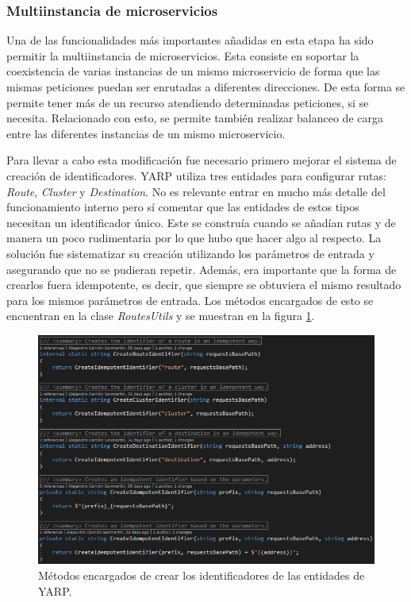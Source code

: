 \documentclass[11pt,spanish,listoffigures]{tfgetsinf}
\begin{document}

			\subsubsection{Multiinstancia de microservicios}

Una de las funcionalidades más importantes añadidas en esta etapa ha sido permitir la multiinstancia de microservicios. Esta consiste en soportar la coexistencia de varias instancias de un mismo microservicio de forma que las mismas peticiones puedan ser enrutadas a diferentes direcciones. De esta forma se permite tener más de un recurso atendiendo determinadas peticiones, si se necesita. Relacionado con esto, se permite también realizar balanceo de carga entre las diferentes instancias de un mismo microservicio.

Para llevar a cabo esta modificación fue necesario primero mejorar el sistema de creación de identificadores. YARP utiliza tres entidades para configurar rutas: \emph{Route}, \emph{Cluster} y \emph{Destination}. No es relevante entrar en mucho más detalle del funcionamiento interno pero sí comentar que las entidades de estos tipos necesitan un identificador único. Este se construía cuando se añadían rutas y de manera un poco rudimentaria por lo que hubo que hacer algo al respecto. La solución fue sistematizar su creación utilizando los parámetros de entrada y asegurando que no se pudieran repetir. Además, era importante que la forma de crearlos fuera idempotente, es decir, que siempre se obtuviera el mismo resultado para los mismos parámetros de entrada. Los métodos encargados de esto se encuentran en la clase \emph{RoutesUtils} y se muestran en la figura \ref{creacionIdentificadores}.

\begin{figure}[ht]
\centering
\includegraphics[width=1\textwidth]{imagenes/creacionIdentificadores}
\caption{Métodos encargados de crear los identificadores de las entidades de YARP.}
	\label{creacionIdentificadores}
\end{figure}
\end{document}
